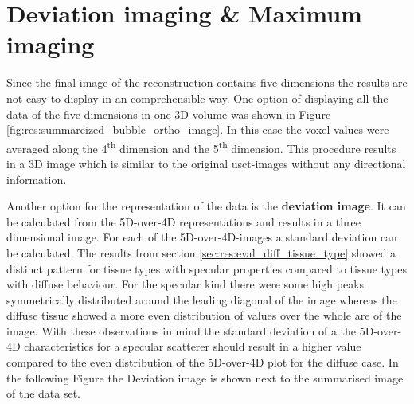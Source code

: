 \section{Deviation imaging \& Maximum imaging}
\label{chap:devi_image}

Since the final image of the reconstruction contains five dimensions the results are not easy to display in an comprehensible way. One option of displaying all the data of the five dimensions in one 3D volume was shown in Figure \ref{fig:res:summareized_bubble_ortho_image}. In this case the voxel values were averaged along the 4\textsuperscript{th} dimension and the 5\textsuperscript{th} dimension. This procedure results in a 3D image which is similar to the original \ac{usct}-images without any directional information.   

\bigskip

Another option for the representation of the data is the \textbf{deviation image}. It can be calculated from the 5D-over-4D representations and results in a three dimensional image. For each of the 5D-over-4D-images a standard deviation can be calculated. The results from section \ref{sec:res:eval_diff_tissue_type} showed a distinct pattern for tissue types with specular properties compared to tissue types with diffuse behaviour. For the specular kind there were some high peaks symmetrically distributed around the leading diagonal of the image whereas the diffuse tissue showed a more even distribution of values over the whole are of the image. With these observations in mind the standard deviation of a the 5D-over-4D characteristics for a specular scatterer should result in a higher value compared to the even distribution of the 5D-over-4D plot for the diffuse case. In the following Figure the Deviation image is shown next to the summarised image of the data set.


